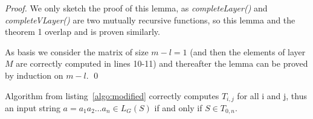 \begin{proof}
We only sketch the proof of this lemma, as \textit{completeLayer()} and \textit{completeVLayer()} are two mutually recursive functions, so this lemma and the theorem 1 overlap and is proven similarly.

As basis we consider the matrix of size $m - l = 1$ (and then the elements of layer $M$ are correctly computed in lines 10-11) and thereafter the lemma can be proved by induction on $m - l$. \qed


\end{proof}

\begin{theorem}
Algorithm from listing~\ref{algo:modified} correctly computes $T_{i, j}$ for all i and j, thus an input string $a = a_{1}a_{2} \dots a_{n} \in L_{G}(S)$ if and only if $S \in T_{0, n}$.
\end{theorem}

